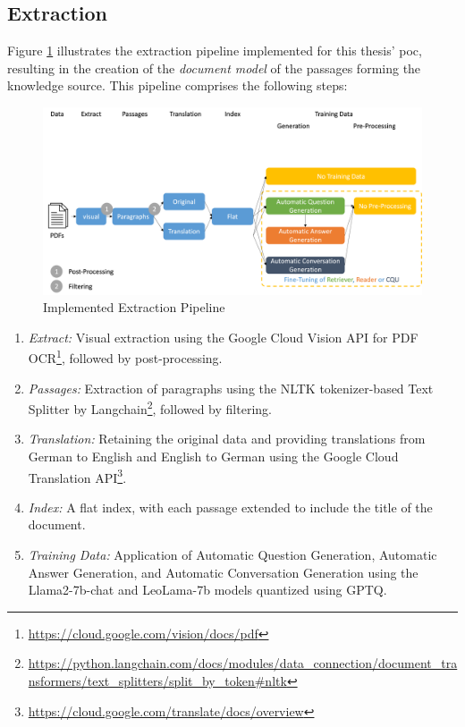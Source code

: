 \subsection{Extraction}
\label{subsec:index}

Figure \ref{fig:extract-pipeline-implementation} illustrates the extraction pipeline implemented for this thesis' \gls{poc}, resulting in the creation of the \textit{document model} of the passages forming the knowledge source. This pipeline comprises the following steps:

\begin{figure}
    \centering
    \includegraphics[width=\textwidth]{Grafiken/Evaluation/extract_implemented.png}
    \caption{Implemented Extraction Pipeline}
    \label{fig:extract-pipeline-implementation}
\end{figure}

\begin{enumerate}
    \item \textit{Extract:} Visual extraction using the Google Cloud Vision API for PDF OCR\footnote{\url{https://cloud.google.com/vision/docs/pdf}}, followed by post-processing.
    \item \textit{Passages:} Extraction of paragraphs using the NLTK tokenizer-based Text Splitter by Langchain\footnote{\url{https://python.langchain.com/docs/modules/data\_connection/document\_transformers/text\_splitters/split\_by\_token\#nltk}}, followed by filtering.
    \item \textit{Translation:} Retaining the original data and providing translations from German to English and English to German using the Google Cloud Translation API\footnote{\url{https://cloud.google.com/translate/docs/overview}}.
    \item \textit{Index:} A flat index, with each passage extended to include the title of the document.
    \item \textit{Training Data:} Application of Automatic Question Generation, Automatic Answer Generation, and Automatic Conversation Generation using the Llama2-7b-chat and LeoLama-7b models quantized using GPTQ.
\end{enumerate}

